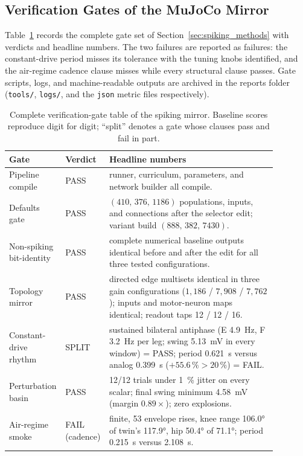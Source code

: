 \subsection{Verification Gates of the MuJoCo Mirror}

Table~\ref{tab:app_spk_gates} records the complete gate set of Section~\ref{sec:spiking_methods} with verdicts and headline numbers. The two failures are reported as failures: the constant-drive period misses its tolerance with the tuning knobs identified, and the air-regime cadence clause misses while every structural clause passes. Gate scripts, logs, and machine-readable outputs are archived in the reports folder (\nolinkurl{tools/}, \nolinkurl{logs/}, and the \texttt{json} metric files respectively).

\begin{table}
\caption{Complete verification-gate table of the spiking mirror. Baseline scores reproduce digit for digit; ``split'' denotes a gate whose clauses pass and fail in part.}
\label{tab:app_spk_gates}
\begin{tabular}{@{}p{0.16\linewidth}p{0.10\linewidth}p{0.62\linewidth}@{}}
\toprule
\textbf{Gate} & \textbf{Verdict} & \textbf{Headline numbers} \\
\midrule
Pipeline compile & PASS & runner, curriculum, parameters, and network builder all compile. \\
Defaults gate & PASS & $(410,\,376,\,1186)$ populations, inputs, and connections after the selector edit; variant build $(888,\,382,\,7430)$. \\
Non-spiking bit-identity & PASS & complete numerical baseline outputs identical before and after the edit for all three tested configurations. \\
Topology mirror & PASS & directed edge multisets identical in three gain configurations ($1{,}186$ / $7{,}908$ / $7{,}762$); inputs and motor-neuron maps identical; readout taps 12 / 12 / 16. \\
Constant-drive rhythm & SPLIT & sustained bilateral antiphase (E \qty{4.9}{\hertz}, F \qty{3.2}{\hertz} per leg; swing \qty{5.13}{\mV} in every window) = PASS; period \qty{0.621}{\second} versus analog \qty{0.399}{\second} ($+55.6\,\% > 20\,\%$) = FAIL. \\
Perturbation basin & PASS & 12/12 trials under \qty{1}{\percent} jitter on every scalar; final swing minimum \qty{4.58}{\mV} (margin $0.89\times$); zero explosions. \\
Air-regime smoke & FAIL (cadence) & finite, 53 envelope rises, knee range \ang{106.0} of twin's \ang{117.9}, hip \ang{50.4} of \ang{71.1}; period \qty{0.215}{\second} versus \qty{2.108}{\second}. \\

\end{tabular}
\end{table}

